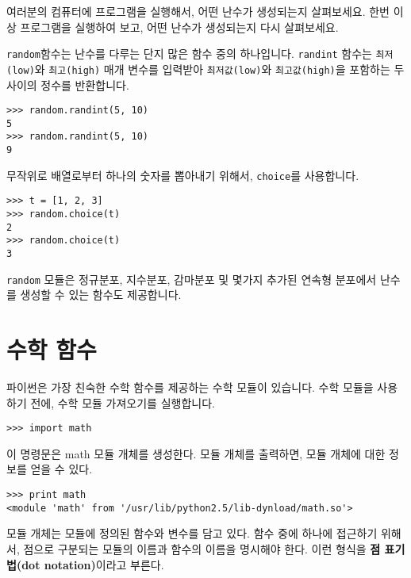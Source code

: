 \begin{ex}
여러분의 컴퓨터에 프로그램을 실행해서, 어떤 난수가 생성되는지 살펴보세요.
한번 이상 프로그램을 실행하여 보고, 어떤 난수가 생성되는지 다시 살펴보세요.
\end{ex}

{\tt random}함수는 난수를 다루는 단지 많은 함수 중의 하나입니다.
{\tt randint} 함수는 {\tt 최저(low)}와 {\tt 최고(high)} 매개 변수를 입력받아
{\tt 최저값(low)}와 {\tt 최고값(high)}을 포함하는 두 사이의 정수를 반환합니다.


\beforeverb
\begin{verbatim}
>>> random.randint(5, 10)
5
>>> random.randint(5, 10)
9
\end{verbatim}
\afterverb
%

무작위로 배열로부터 하나의 숫자를 뽑아내기 위해서, {\tt choice}를 사용합니다.


\beforeverb
\begin{verbatim}
>>> t = [1, 2, 3]
>>> random.choice(t)
2
>>> random.choice(t)
3
\end{verbatim}
\afterverb
%

{\tt random} 모듈은 정규분포, 지수분포, 감마분포 및 몇가지 추가된 연속형 분포에서
난수를 생성할 수 있는 함수도 제공합니다.

\section{수학 함수}

파이썬은 가장 친숙한 수학 함수를 제공하는 수학 모듈이 있습니다.
수학 모듈을 사용하기 전에, 수학 모듈 가져오기를 실행합니다.

\beforeverb
\begin{verbatim}
>>> import math
\end{verbatim}
\afterverb
%

이 명령문은 math 모듈 개체를 생성한다. 모듈 개체를 출력하면, 모듈 개체에 대한 정보를 얻을 수 있다.

\beforeverb
\begin{verbatim}
>>> print math
<module 'math' from '/usr/lib/python2.5/lib-dynload/math.so'>
\end{verbatim}
\afterverb
%

모듈 개체는 모듈에 정의된 함수와 변수를 담고 있다. 함수 중에 하나에 접근하기 위해서, 점으로 구분되는 모듈의 이름과 함수의 이름을 명시해야 한다.
이런 형식을 {\bf 점 표기법(dot notation)}이라고 부른다.


